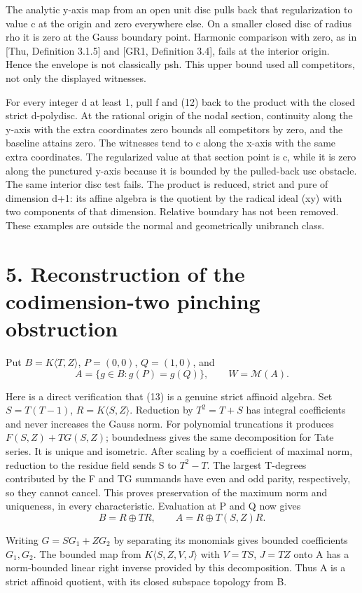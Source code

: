 \documentclass[11pt,a4paper]{article}
\begin{document}
The analytic y-axis map from an open unit disc pulls back that regularization to value c at the origin and zero everywhere else. On a smaller closed disc of radius rho it is zero at the Gauss boundary point. Harmonic comparison with zero, as in [Thu, Definition 3.1.5] and [GR1, Definition 3.4], fails at the interior origin. Hence the envelope is not classically psh. This upper bound used all competitors, not only the displayed witnesses.

For every integer d at least 1, pull f and (12) back to the product with the closed strict d-polydisc. At the rational origin of the nodal section, continuity along the y-axis with the extra coordinates zero bounds all competitors by zero, and the baseline attains zero. The witnesses tend to c along the x-axis with the same extra coordinates. The regularized value at that section point is c, while it is zero along the punctured y-axis because it is bounded by the pulled-back usc obstacle. The same interior disc test fails. The product is reduced, strict and pure of dimension d+1: its affine algebra is the quotient by the radical ideal (xy) with two components of that dimension. Relative boundary has not been removed. These examples are outside the normal and geometrically unibranch class.

\section*{5. Reconstruction of the codimension-two pinching obstruction}

Put \(B=K\langle T,Z\rangle\), \(P=(0,0)\), \(Q=(1,0)\), and
\[
A=\{g\in B:g(P)=g(Q)\},\qquad W=\mathcal M(A).
\tag{13}
\]

Here is a direct verification that (13) is a genuine strict affinoid algebra. Set \(S=T(T-1)\), \(R=K\langle S,Z\rangle\). Reduction by \(T^2=T+S\) has integral coefficients and never increases the Gauss norm. For polynomial truncations it produces \(F(S,Z)+TG(S,Z)\); boundedness gives the same decomposition for Tate series. It is unique and isometric. After scaling by a coefficient of maximal norm, reduction to the residue field sends S to \(T^2-T\). The largest T-degrees contributed by the F and TG summands have even and odd parity, respectively, so they cannot cancel. This proves preservation of the maximum norm and uniqueness, in every characteristic. Evaluation at P and Q now gives
\[
B=R\oplus TR,\qquad A=R\oplus T(S,Z)R.
\tag{14}
\]

Writing \(G=SG_1+ZG_2\) by separating its monomials gives bounded coefficients \(G_1,G_2\). The bounded map from \(K\langle S,Z,V,J\rangle\) with \(V=TS\), \(J=TZ\) onto A has a norm-bounded linear right inverse provided by this decomposition. Thus A is a strict affinoid quotient, with its closed subspace topology from B.
\end{document}
